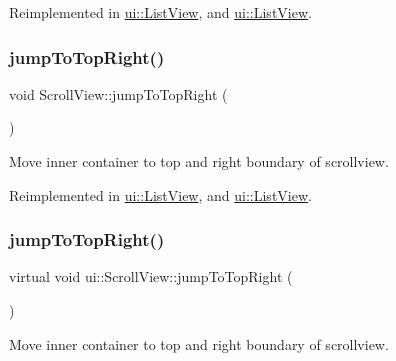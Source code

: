 Reimplemented in \hyperlink{classui_1_1ListView_a16fed680b5ef2a65ae0e3a1540e9727e}{ui\+::\+List\+View}, and \hyperlink{classui_1_1ListView_a18c1e20a9c26bffa2ff05156673d4ce9}{ui\+::\+List\+View}.

\mbox{\label{classui_1_1ScrollView_ae2496521c218e2e53a364d98f223883b}} 
\subsubsection{\texorpdfstring{jump\+To\+Top\+Right()}{jumpToTopRight()}\hspace{0.1cm}{\footnotesize\ttfamily [1/2]}}
{\footnotesize\ttfamily void Scroll\+View\+::jump\+To\+Top\+Right (\begin{DoxyParamCaption}{ }\end{DoxyParamCaption})\hspace{0.3cm}{\ttfamily [virtual]}}

Move inner container to top and right boundary of scrollview. 

Reimplemented in \hyperlink{classui_1_1ListView_a7b90df8fdae3bf08a3714c332f8c2854}{ui\+::\+List\+View}, and \hyperlink{classui_1_1ListView_a9410511689cc348ef305886a44ec0d96}{ui\+::\+List\+View}.

\mbox{\label{classui_1_1ScrollView_a38cb736ff123d1cda6f81d98b3ef3e97}} 
\subsubsection{\texorpdfstring{jump\+To\+Top\+Right()}{jumpToTopRight()}\hspace{0.1cm}{\footnotesize\ttfamily [2/2]}}
{\footnotesize\ttfamily virtual void ui\+::\+Scroll\+View\+::jump\+To\+Top\+Right (\begin{DoxyParamCaption}{ }\end{DoxyParamCaption})\hspace{0.3cm}{\ttfamily [virtual]}}

Move inner container to top and right boundary of scrollview. 

